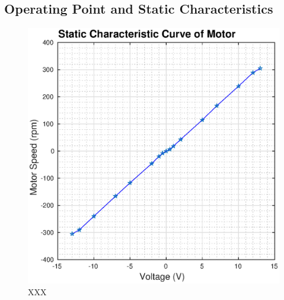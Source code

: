 \subsection{Operating Point and Static Characteristics}

\begin{figure}[t]
    \centering
    \includegraphics[width=\linewidth]{images/static_cc}
    \caption{XXX}
\end{figure}

